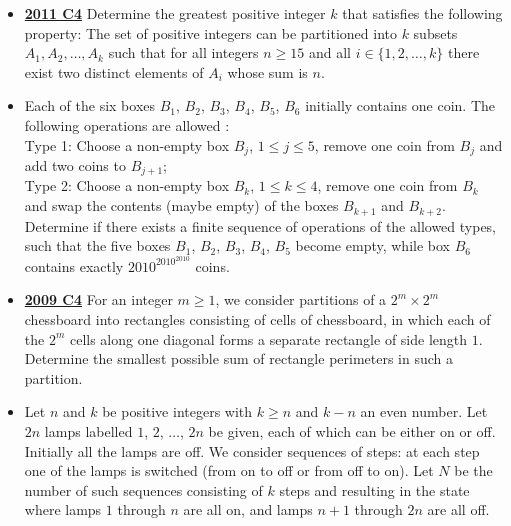 \documentclass[11pt]{scrartcl}
\begin{document}
\begin{itemize}[leftmargin=*]
Player $A$'s goal is to ensure at least $1$ coin in each box after every move of hers, regardless of how $B$ plays and how many moves are made. Find the least $N$ that enables her to succeed. 
\item \href{https://artofproblemsolving.com/community/c6h488627p2738014}{\textbf{2011 C4}} Determine the greatest positive integer $k$ that satisfies the following property: The set of positive integers can be partitioned into $k$ subsets $A_1, A_2, \dots, A_k$ such that for all integers $n \geqslant  15$ and all $i \in \{1, 2, \dots, k\}$ there exist two distinct elements of $A_i$ whose sum is $n.$ 
\item {} Each of the six boxes $B_1$, $B_2$, $B_3$, $B_4$, $B_5$, $B_6$ initially contains one coin. The following operations are allowed : \\
Type 1: Choose a non-empty box $B_j$, $1\leqslant j \leqslant 5$, remove one coin from $B_j$ and add two coins to $B_{j+1}$; \\
Type 2: Choose a non-empty box $B_k$, $1\leqslant k \leqslant 4$, remove one coin from $B_k$ and swap the contents (maybe empty) of the boxes $B_{k+1}$ and $B_{k+2}$. \\
Determine if there exists a finite sequence of operations of the allowed types, such that the five boxes $B_1$, $B_2$, $B_3$, $B_4$, $B_5$ become empty, while box $B_6$ contains exactly $2010^{2010^{2010}}$ coins. 
\item \href{https://artofproblemsolving.com/community/c6h355785p1932929}{\textbf{2009 C4}} For an integer $m\geqslant  1$, we consider partitions of a $2^m\times 2^m$ chessboard into rectangles consisting of cells of chessboard, in which each of the $2^m$ cells along one diagonal forms a separate rectangle of side length $1$. Determine the smallest possible sum of rectangle perimeters in such a partition. 
\item {} 	Let $ n$ and $ k$ be positive integers with $ k \geqslant  n$ and $ k - n$ an even number. Let $ 2n$ lamps labelled $ 1$, $ 2$, $\dots$, $ 2n$ be given, each of which can be either on or off. Initially all the lamps are off. We consider sequences of steps: at each step one of the lamps is switched (from on to off or from off to on). 
Let $ N$ be the number of such sequences consisting of $ k$ steps and resulting in the state where lamps $ 1$ through $ n$ are all on, and lamps $ n + 1$ through $ 2n$ are all off. 

\end{itemize}
\end{document}
